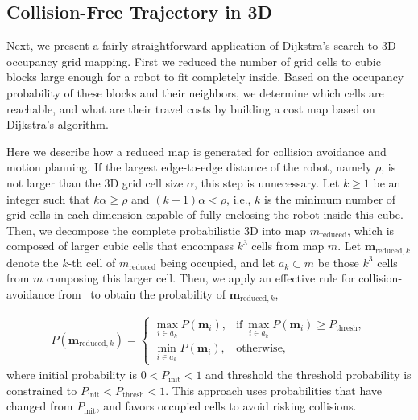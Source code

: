 \documentclass[conf]{new-aiaa}
\begin{document}
\subsection{Collision-Free Trajectory in 3D}

Next, we present a fairly straightforward application of Dijkstra's search to 3D occupancy grid mapping. First we reduced the number of grid cells to cubic blocks large enough for a robot to fit completely inside. Based on the occupancy probability of these blocks and their neighbors, we determine which cells are reachable, and what are their travel costs by building a cost map based on Dijkstra's algorithm.

Here we describe how a reduced map is generated for collision avoidance and motion planning. If the largest edge-to-edge distance of the robot, namely $\rho$, is not larger than the 3D grid cell size $\alpha$, this step is unnecessary. Let $k\geq1$ be an integer such that $k\alpha\geq\rho$ and $(k-1)\alpha<\rho$, i.e., $k$ is the minimum number of grid cells in each dimension capable of fully-enclosing the robot inside this cube. Then, we decompose the complete probabilistic 3D into map $m_\text{reduced}$, which is composed of larger cubic cells that encompass $k^3$ cells from map $m$. Let $\mathbf{m}_{\text{reduced},k}$ denote the $k$-th cell of $m_\text{reduced}$ being occupied, and let $a_k\subset m$ be those $k^3$ cells from $m$ composing this larger cell. Then, we apply an effective rule for collision-avoidance from~\cite{KauTakAiLee18} to obtain the probability of $\mathbf{m}_{\text{reduced},k}$,

\begin{align}
\label{eqn:Proj3DMapComb}
P(\mathbf{m}_{\text{reduced},k})= 
\begin{cases}
    \max_{i\in a_k}{P(\mathbf{m}_i)},	&\text{if} \ \max_{i\in a_k}{P(\mathbf{m}_i)}\geq P_\text{thresh},\\
    \min_{i\in a_k}{P(\mathbf{m}_i)},	& \text{otherwise},
\end{cases}
\end{align}
where initial probability is $0<P_\text{init}<1$ and threshold the threshold probability is constrained to $P_\text{init}<P_\text{thresh}<1$. This approach uses probabilities that have changed from $P_\text{init}$, and favors occupied cells to avoid risking collisions.
\end{document}
